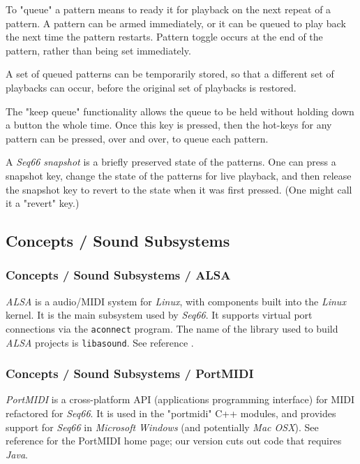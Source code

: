    To "queue" a pattern means to ready it for playback on the next repeat of
   a pattern.  A pattern can be armed immediately, or it can be queued to
   play back the next time the pattern restarts.
   Pattern toggle occurs at the end of the pattern,
   rather than being set immediately.

   A set of queued patterns can be temporarily stored, so that a different
   set of playbacks can occur, before the original set of playbacks is
   restored.

   The "keep queue" functionality allows the queue to be held without
   holding down a button the whole time.  Once this key is pressed,
   then the hot-keys for any pattern can be pressed, over and over,
   to queue each pattern.

   A \textsl{Seq66} \textsl{snapshot} is a briefly preserved
   state of the patterns.  One can press a snapshot key, change the state of
   the patterns for live playback, and then release the snapshot key to
   revert to the state when it was first pressed.  (One might call it a
   "revert" key.)

\subsection{Concepts / Sound Subsystems}
\label{subsec:concepts_sound_subsystems}

\subsubsection{Concepts / Sound Subsystems / ALSA}
\label{subsubsec:concepts_sound_alsa}

   \textsl{ALSA} is a audio/MIDI system for \textsl{Linux}, with components built
   into the \textsl{Linux} kernel. It is the main subsystem used by
   \textsl{Seq66}.
   It supports virtual port connections via the \texttt{aconnect} program.
   The name of the library used to build
   \textsl{ALSA} projects is \texttt{libasound}.
   See reference \cite{alsa}.

\subsubsection{Concepts / Sound Subsystems / PortMIDI}
\label{subsubsec:concepts_sound_portmidi}

   \textsl{PortMIDI} is a cross-platform API (applications programming
   interface) for MIDI refactored for \textsl{Seq66}.
   It is used in the "portmidi" C++ modules, and provides support for
   \textsl{Seq66} in \textsl{Microsoft Windows} (and potentially
   \textsl{Mac OSX}).
   See reference \cite{portmidi} for the PortMIDI home page; our version
   cuts out code that requires \textsl{Java}.

